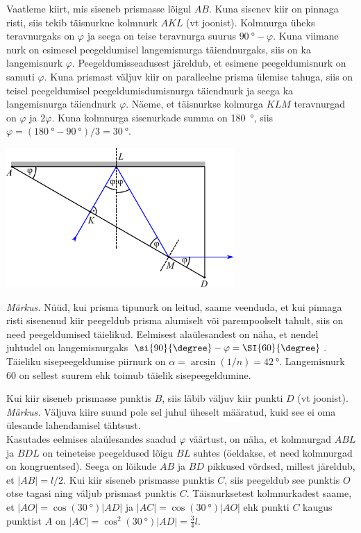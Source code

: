 \documentclass[11pt, twoside]{article}
\begin{document}
{{\osa Vaatleme kiirt, mis siseneb prismasse lõigul $AB$. Kuna sisenev kiir on pinnaga risti, siis tekib täisnurkne kolmnurk $AKL$ (vt joonist). Kolmnurga üheks teravnurgaks on $\varphi$ ja seega on teise teravnurga suurus $\SI{90}{\degree}-\varphi$. Kuna viimane nurk on esimesel peegeldumisel langemisnurga täiendnurgaks, siis on ka langemisnurk $\varphi$. Peegeldumisseadusest järeldub, et esimene peegeldumisnurk on samuti $\varphi$. Kuna prismast väljuv kiir on paralleelne prisma ülemise tahuga, siis on teisel peegeldumisel peegeldumisdumisnurga täiendnurk ja seega ka langemisnurga täiendnurk $\varphi$. Näeme, et täisnurkse kolmurga $KLM$ teravnurgad on $\varphi$ ja $2\varphi$. Kuna kolmnurga sisenurkade summa on \SI{180}{\degree}, siis $\varphi=(\SI{180}{\degree}-\SI{90}{\degree})/3=\SI{30}{\degree}$.

\begin{center}
  \includegraphics[width=0.65\textwidth]{2014-v3g-04-periskoopprillid_lahendus_joonis2.pdf}
\end{center}

\emph{Märkus.} Nüüd, kui prisma tipunurk on leitud, saame veenduda, et kui pinnaga risti sisenenud kiir peegeldub prisma alumiselt või parempoolselt tahult, siis on need peegeldumised täielikud. Eelmisest alaülesandest on näha, et nendel juhtudel on langemisnurgaks $\si{90}{\degree}-\varphi=\SI{60}{\degree}$. Täieliku sisepeegeldumise piirnurk on $\alpha=\arcsin(1/n)=\SI{42}{\degree}$. Langemisnurk \si{60}{\degree} on sellest suurem ehk toimub täielik sisepeegeldumine.

\osa Kui kiir siseneb prismasse punktis $B$, siis läbib väljuv kiir punkti $D$ (vt joonist).\\
\emph{Märkus.} Väljuva kiire suund pole sel juhul üheselt määratud, kuid see ei oma ülesande lahendamisel tähtsust.\\
Kasutades eelmises alaülesandes saadud $\varphi$ väärtust, on näha, et kolmnurgad $ABL$ ja $BDL$ on teineteise peegeldused lõigu $BL$ suhtes (öeldakse, et need kolmnurgad on kongruentsed). Seega on lõikude $AB$ ja $BD$ pikkused võrdsed, millest järeldub, et $|AB|=l/2$. Kui kiir siseneb prismasse punktis $C$, siis peegeldub see punktis $O$ otse tagasi ning väljub prismast punktis $C$. Täisnurksetest kolmnurkadest saame, et $|AO|=\cos(\SI{30}{\degree})|AD|$ ja $|AC|=\cos(\SI{30}{\degree})|AO|$ ehk punkti $C$ kaugus punktist $A$ on $|AC|=\cos^2(\SI{30}{\degree})|AD|=\frac{3}{4}l$.

}}
\end{document}
